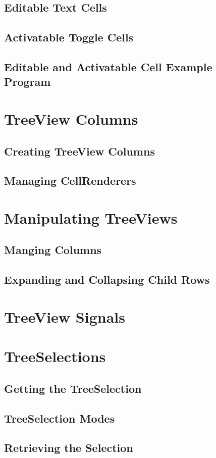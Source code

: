 	\subsection{Editable Text Cells}
	\subsection{Activatable Toggle Cells}
	\subsection{Editable and Activatable Cell Example Program}
\section{TreeView Columns}
	\subsection{Creating TreeView Columns}
	\subsection{Managing CellRenderers}
\section{Manipulating TreeViews}
	\subsection{Manging Columns}
	\subsection{Expanding and Collapsing Child Rows}
\section{TreeView Signals}
\section{TreeSelections}
	\subsection{Getting the TreeSelection}
	\subsection{TreeSelection Modes}
	\subsection{Retrieving the Selection}
